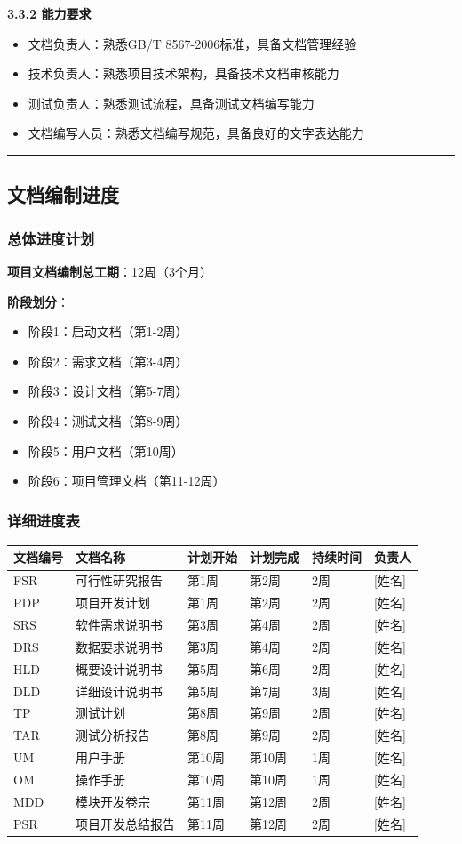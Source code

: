 \documentclass[12pt,a4paper]{article}
\numberwithin{equation}{section}  %
\begin{document}
\textbf{3.3.2 能力要求}
\begin{itemize}
\item 文档负责人：熟悉GB/T 8567-2006标准，具备文档管理经验
\item 技术负责人：熟悉项目技术架构，具备技术文档审核能力
\item 测试负责人：熟悉测试流程，具备测试文档编写能力
\item 文档编写人员：熟悉文档编写规范，具备良好的文字表达能力
\end{itemize}

\hrule
\subsection{文档编制进度}
\subsubsection{总体进度计划}
\textbf{项目文档编制总工期}：12周（3个月）

\textbf{阶段划分}：
\begin{itemize}
\item 阶段1：启动文档（第1-2周）
\item 阶段2：需求文档（第3-4周）
\item 阶段3：设计文档（第5-7周）
\item 阶段4：测试文档（第8-9周）
\item 阶段5：用户文档（第10周）
\item 阶段6：项目管理文档（第11-12周）
\end{itemize}

\subsubsection{详细进度表}
\begin{longtable}{|p{2.67cm}|p{2.67cm}|p{2.67cm}|p{2.67cm}|p{2.67cm}|p{2.67cm}|}
\hline
文档编号 & 文档名称 & 计划开始 & 计划完成 & 持续时间 & 负责人 \\
\hline
FSR & 可行性研究报告 & 第1周 & 第2周 & 2周 & [姓名] \\
PDP & 项目开发计划 & 第1周 & 第2周 & 2周 & [姓名] \\
SRS & 软件需求说明书 & 第3周 & 第4周 & 2周 & [姓名] \\
DRS & 数据要求说明书 & 第3周 & 第4周 & 2周 & [姓名] \\
HLD & 概要设计说明书 & 第5周 & 第6周 & 2周 & [姓名] \\
DLD & 详细设计说明书 & 第5周 & 第7周 & 3周 & [姓名] \\
TP & 测试计划 & 第8周 & 第9周 & 2周 & [姓名] \\
TAR & 测试分析报告 & 第8周 & 第9周 & 2周 & [姓名] \\
UM & 用户手册 & 第10周 & 第10周 & 1周 & [姓名] \\
OM & 操作手册 & 第10周 & 第10周 & 1周 & [姓名] \\
MDD & 模块开发卷宗 & 第11周 & 第12周 & 2周 & [姓名] \\
PSR & 项目开发总结报告 & 第11周 & 第12周 & 2周 & [姓名] \\
\hline
\end{longtable}
\end{document}
